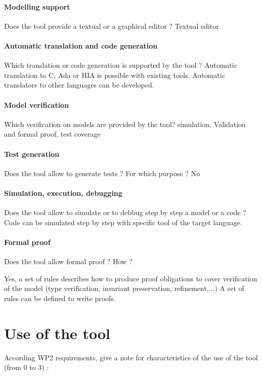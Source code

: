 \paragraph{Modelling support}
Does the tool provide a  textual or a graphical editor ?
Textual editor

\paragraph{Automatic translation and code generation}
Which translation or code generation is supported by the tool ?
Automatic translation to  C, Ada or HIA is possible with existing tools. Automatic translators to other languages can be developed.

\paragraph{Model verification}
Which verification on models are provided by the tool?
simulation, Validation and formal proof, test coverage

\paragraph{Test generation}
Does the tool allow to generate tests ? For  which purpose ?
No

\paragraph{Simulation, execution, debugging}
Does the tool allow to simulate or to debbug step by step a model or a code ?
Code can be simulated step  by step with specific tool of the target language.


\paragraph{Formal proof}
Does the tool allow formal proof ?  How ?

Yes, a set of rules describes how to  produce proof obligations to cover verification of the model (type verification, invariant preservation, refinement,...)
A set of rules can be defined to  write proofs.  

\section{Use of the tool}


According WP2 requirements, give a note for characteristics of the use of the tool (from 0 to 3) :


